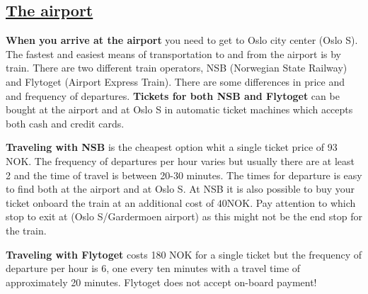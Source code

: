 \documentclass{article}
\begin{document}
\begin{center}
\begin{changemargin}{-1cm}{-1cm}
\end{changemargin}
\end{center}

\clearpage
\subsection*{\underline{The airport}}

\textbf{When you arrive at the airport} you need to
get to Oslo city center (Oslo S).
The fastest and easiest means of transportation to and from the airport
is by train. There are two different train operators, NSB
(Norwegian State Railway) and Flytoget (Airport Express Train).
There are some differences in price and
 and frequency of departures.
\textbf{Tickets for both NSB and Flytoget} can be bought at the airport
and at Oslo S in automatic ticket machines which accepts both cash
and credit cards.

\textbf{Traveling with NSB} is the cheapest
option whit a single ticket price
of 93 NOK. The frequency of departures per hour varies but
usually there are at least 2 and the time of travel is between
20-30 minutes. The times for departure is easy to find
both at the airport and at Oslo S.
At NSB it is also possible to buy your ticket
onboard the train at an additional cost of $40$NOK.
Pay attention to which stop to exit at (Oslo S/Gardermoen airport)
as this might not be the end stop for the train.

\textbf{Traveling with Flytoget} costs 180 NOK for a single ticket
but the frequency of departure per hour is 6, one every
ten minutes with a travel time of approximately 20 minutes.
Flytoget does not accept on-board payment!
\end{document}
